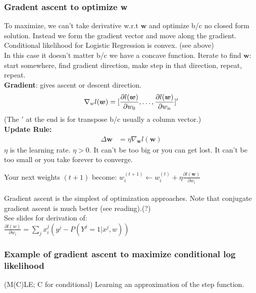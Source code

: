 \subsubsection{Gradent ascent to optimize w}
To maximize, we can't take derivative w.r.t $\bm{w}$ and optimize b/c no closed form solution.  %
Instead we form the gradient vector and move along the gradient. %
Conditional likelihood for Logistic Regression is convex.  (see above)  \hfill \\
In this case it doesn't matter b/c we have a concave function.  %
Iterate to find $\bm{w}$: start somewhere, find gradient direction, make step in that direction, repeat, repeat.
\hfill \\

\textbf{Gradient}:  gives ascent or descent direction. \hfill \\
\begin{align*}
	\nabla_w l(\bm{w}) = [\frac{\partial l(\bm{w})}{\partial w_0}, \dots, \frac{\partial l(\bm{w})}{\partial w_n}]'  \hfill \\
\end{align*}
	(The $'$ at the end is for transpose b/c usually a column vector.)  \hfill \\
\textbf{Update Rule:} \hfill \\
\begin{align*}
	\Delta \bm{w} &= \eta \nabla_{\bm{w}} l(\bm{w})
\end{align*}
$\eta$ is the learning rate.  $\eta > 0$.  
	It can't be too big or you can get lost.  
	It can't be too small or you take forever to converge. 

Your next weights $(t+1)$ become: 
$w_i^{(t+1)} \leftarrow w_i^{(t)} + \eta \frac{\partial l(\bm{w})}{\partial w_i}$   \hfill \\
\hfill \\
Gradient ascent is the simplest  of optimization approaches.  
Note that conjugate gradient ascent is much better (see reading).(?)  \hfill \\

See slides for derivation of: \hfill \\
$\displaystyle \frac{\partial l(w)}{\partial w_i} = \sum_j x_i^j (y^j - P(Y^j = 1 | x^j, w))$

\subsubsection{Example of gradient ascent to maximize conditional log likelihood}
(M(C)LE; C for conditional) \hfill
Learning an approximation of the step function.  %

